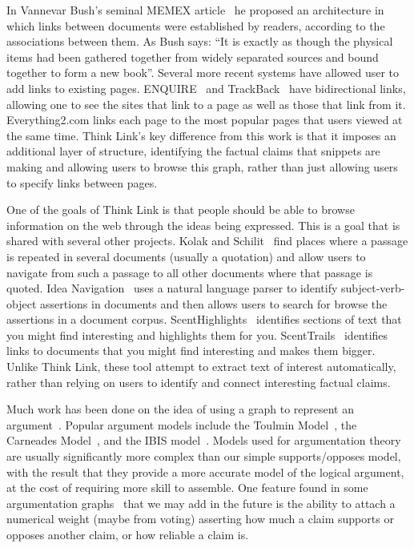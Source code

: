 \documentclass{chi2009}
\begin{document}
In Vannevar Bush's seminal MEMEX article~\cite{memex} he proposed an architecture in which links between documents were established by readers, according to the associations between them. As Bush says: ``It is exactly as though the physical items had been gathered together from widely separated sources and bound together to form a new book''. Several more recent systems have allowed user to add links to existing pages. ENQUIRE~\cite{weavingtheweb} and TrackBack~\cite{trackback} have bidirectional links, allowing one to see the sites that link to a page as well as those that link from it. Everything2.com links each page to the most popular pages that users viewed at the same time. Think Link's key difference from this work is that it imposes an additional layer of structure, identifying the factual claims that snippets are making and allowing users to browse this graph, rather than just allowing users to specify links between pages.

One of the goals of Think Link is that people should be able to browse information on the web through the ideas being expressed. This is a goal that is shared with several other projects. Kolak and Schilit~\cite{quotations} find places where a passage is repeated in several documents (usually a quotation) and allow users to navigate from such a passage to all other documents where that passage is quoted. Idea Navigation~\cite{ideanavigation} uses a natural language parser to identify subject-verb-object assertions in documents and then allows users to search for browse the assertions in a document corpus. ScentHighlights~\cite{Chi2005} identifies sections of text that you might find interesting and highlights them for you. ScentTrails~\cite{Center2003} identifies links to documents that you might find interesting and makes them bigger. Unlike Think Link, these tool attempt to extract text of interest automatically, rather than relying on users to identify and connect interesting factual claims.

Much work has been done on the idea of using a graph to represent an argument~\cite{argumentation,argmas}. Popular argument models include the Toulmin Model~\cite{toulmin}, the Carneades Model~\cite{carneades}, and the IBIS model~\cite{ibis}. Models used for argumentation theory are usually significantly more complex than our simple supports/opposes model, with the result that they provide a more accurate model of the logical argument, at the cost of requiring more skill to assemble. One feature found in some argumentation graphs~\cite{Korb97acognitive} that we may add in the future is the ability to attach a numerical weight (maybe from voting) asserting how much a claim supports or opposes another claim, or how reliable a claim is.
\end{document}
